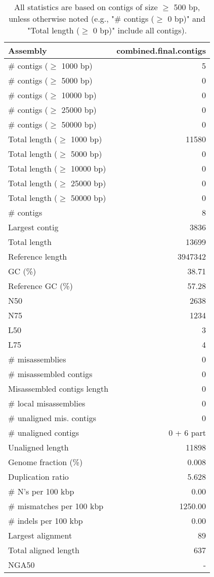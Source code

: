 \documentclass[12pt,a4paper]{article}
\begin{document}
\begin{table}[ht]
\begin{center}
\caption{All statistics are based on contigs of size $\geq$ 500 bp, unless otherwise noted (e.g., "\# contigs ($\geq$ 0 bp)" and "Total length ($\geq$ 0 bp)" include all contigs).}
\begin{tabular}{|l*{1}{|r}|}
\hline
Assembly & combined.final.contigs \\ \hline
\# contigs ($\geq$ 1000 bp) & 5 \\ \hline
\# contigs ($\geq$ 5000 bp) & 0 \\ \hline
\# contigs ($\geq$ 10000 bp) & 0 \\ \hline
\# contigs ($\geq$ 25000 bp) & 0 \\ \hline
\# contigs ($\geq$ 50000 bp) & 0 \\ \hline
Total length ($\geq$ 1000 bp) & 11580 \\ \hline
Total length ($\geq$ 5000 bp) & 0 \\ \hline
Total length ($\geq$ 10000 bp) & 0 \\ \hline
Total length ($\geq$ 25000 bp) & 0 \\ \hline
Total length ($\geq$ 50000 bp) & 0 \\ \hline
\# contigs & 8 \\ \hline
Largest contig & 3836 \\ \hline
Total length & 13699 \\ \hline
Reference length & 3947342 \\ \hline
GC (\%) & 38.71 \\ \hline
Reference GC (\%) & 57.28 \\ \hline
N50 & 2638 \\ \hline
N75 & 1234 \\ \hline
L50 & 3 \\ \hline
L75 & 4 \\ \hline
\# misassemblies & 0 \\ \hline
\# misassembled contigs & 0 \\ \hline
Misassembled contigs length & 0 \\ \hline
\# local misassemblies & 0 \\ \hline
\# unaligned mis. contigs & 0 \\ \hline
\# unaligned contigs & 0 + 6 part \\ \hline
Unaligned length & 11898 \\ \hline
Genome fraction (\%) & 0.008 \\ \hline
Duplication ratio & 5.628 \\ \hline
\# N's per 100 kbp & 0.00 \\ \hline
\# mismatches per 100 kbp & 1250.00 \\ \hline
\# indels per 100 kbp & 0.00 \\ \hline
Largest alignment & 89 \\ \hline
Total aligned length & 637 \\ \hline
NGA50 & - \\ \hline
\end{tabular}
\end{center}
\end{table}
\end{document}
